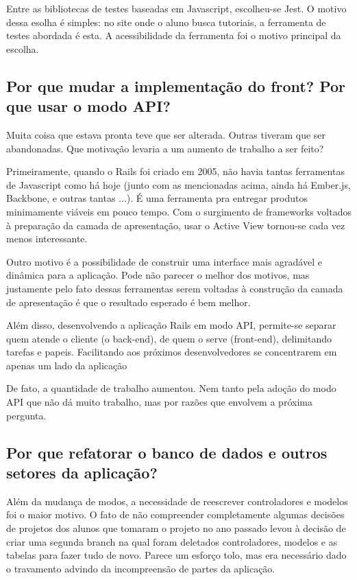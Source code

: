 Entre as bibliotecas de testes baseadas em Javascript, escolheu-se Jest. O motivo dessa esolha é simples:
no site onde o aluno busca tutoriais, a ferramenta de testes abordada é esta. A acessibilidade da ferramenta
foi o motivo principal da escolha.

\subsection{Por que mudar a implementação do front? Por que usar o modo API?}

Muita coisa que estava pronta teve que ser alterada. Outras tiveram que ser abandonadas. Que motivação levaria
a um aumento de trabalho a ser feito?

Primeiramente, quando o Rails foi criado em 2005, não havia tantas ferramentas de Javascript como há hoje
(junto com as mencionadas acima, ainda há Ember.js, Backbone, e outras tantas ...). É uma ferramenta pra
entregar produtos minimamente viáveis em pouco tempo. Com o surgimento de frameworks voltados à preparação
da camada de apresentação, usar o Active View tornou-se cada vez menos interessante.

Outro motivo é a possibilidade de construir uma interface mais agradável e dinâmica para a aplicação. Pode não
parecer o melhor dos motivos, mas justamente pelo fato dessas ferramentas  serem voltadas à construção
da camada de apresentação é que o resultado esperado é bem melhor.

Além disso, desenvolvendo a aplicação Rails em modo API, permite-se separar quem atende o cliente (o back-end),
de quem o serve (front-end), delimitando tarefas e papeis. Facilitando aos próximos desenvolvedores se concentrarem em apenas um lado da aplicação

De fato, a quantidade de trabalho aumentou. Nem tanto pela adoção do modo API que não dá muito trabalho, mas por
razões que envolvem a próxima pergunta.

\subsection{Por que refatorar o banco de dados e outros setores da aplicação?}
\label{subsec:refatorar}

Além da mudança de modos, a necessidade de reescrever controladores e modelos foi o maior motivo. O fato de não
compreender completamente algumas decisões de projetos dos alunos que tomaram o projeto no ano passado levou à
decisão de criar uma segunda branch na qual foram deletados controladores, modelos e as tabelas para fazer tudo
de novo. Parece um esforço tolo, mas era necessário dado o travamento advindo da incompreensão de partes da aplicação.

